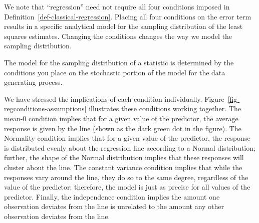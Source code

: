 \documentclass[
  letterpaper,
  DIV=11,
  numbers=noendperiod]{scrreprt}
\theoremstyle{definition}
\theoremstyle{definition}
\theoremstyle{plain}
\theoremstyle{remark}
\begin{document}
We note that ``regression'' need not require all four conditions imposed
in Definition~\ref{def-classical-regression}. Placing all four
conditions on the error term results in a specific analytical model for
the sampling distribution of the least squares estimates. Changing the
conditions changes the way we model the sampling distribution.

\begin{tcolorbox}[enhanced jigsaw, colbacktitle=quarto-callout-tip-color!10!white, colback=white, left=2mm, title=\textcolor{quarto-callout-tip-color}{\faLightbulb}\hspace{0.5em}{Big Idea}, toptitle=1mm, leftrule=.75mm, breakable, bottomrule=.15mm, arc=.35mm, rightrule=.15mm, toprule=.15mm, coltitle=black, opacityback=0, colframe=quarto-callout-tip-color-frame, opacitybacktitle=0.6, bottomtitle=1mm, titlerule=0mm]

The model for the sampling distribution of a statistic is determined by
the conditions you place on the stochastic portion of the model for the
data generating process.

\end{tcolorbox}

We have stressed the implications of each condition individually.
Figure~\ref{fig-regconditions-assumptions} illustrates these conditions
working together. The mean-0 condition implies that for a given value of
the predictor, the average response is given by the line (shown as the
dark green dot in the figure). The Normality condition implies that for
a given value of the predictor, the response is distributed evenly about
the regression line according to a Normal distribution; further, the
shape of the Normal distribution implies that these responses will
cluster about the line. The constant variance condition implies that
while the responses vary around the line, they do so to the same degree,
regardless of the value of the predictor; therefore, the model is just
as precise for all values of the predictor. Finally, the independence
condition implies the amount one observation deviates from the line is
unrelated to the amount any other observation deviates from the line.
\end{document}
